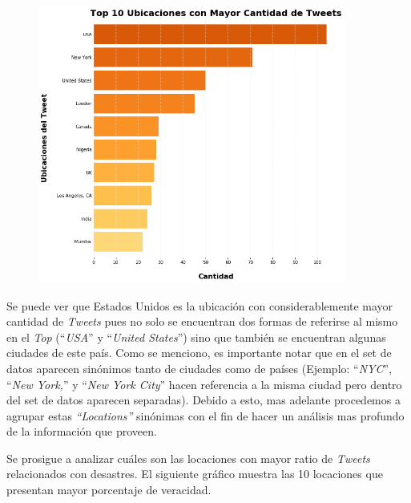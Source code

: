 \documentclass[titlepage,a4paper]{article}
\begin{document}
    \begin{figure}[H]
    \centering
    \includegraphics[width=0.9\textwidth]{graficos/Analisis de Locacion/top_10_locaciones_con_mayor_cantidad_de_tweets.png}
    \caption{} 
    \end{figure}
    
    Se puede ver que Estados Unidos es la ubicación con considerablemente mayor cantidad de \textit{Tweets} pues no solo se encuentran dos formas de referirse al mismo en el \textit{Top} (``\textit{USA}'' y ``\textit{United States}'') sino que también se encuentran algunas ciudades de este país. Como se menciono, es importante notar que en el set de datos aparecen sinónimos tanto de ciudades como de países (Ejemplo: ``\textit{NYC}'', ``\textit{New York,}'' y ``\textit{New York City}'' hacen referencia a la misma ciudad pero dentro del set de datos aparecen separadas). Debido a esto, mas adelante procedemos a agrupar estas \textit{``Locations''} sinónimas con el fin de hacer un análisis mas profundo de la información que proveen. 
    
    Se prosigue a analizar cuáles son las locaciones con mayor ratio de \textit{Tweets} relacionados con desastres. El siguiente gráfico muestra las 10 locaciones que presentan mayor porcentaje de veracidad. 
    
\end{document}
